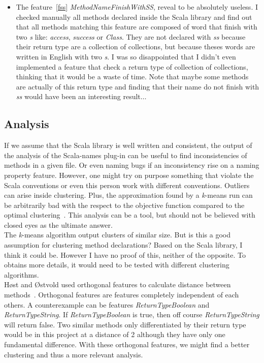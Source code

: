 \documentclass[12pt]{article}
\begin{document}
\begin{itemize}
\item The feature~\ref{fss} \textit{MethodNameFinishWithSS}, reveal to be absolutely useless. I checked manually all methods declared inside the Scala library and find out that all methods matching this feature are composed of word that finish with two \textit{s} like: \textit{access}, \textit{success} or \textit{Class}. They are not declared with \textit{ss} because their return type are a collection of collections, but because theses words are written in English with two \textit{s}. I was so disappointed that I didn't even implemented a feature that check a return type of collection of collections, thinking that it would be a waste of time. Note that maybe some methods are actually of this return type and finding that their name do not finish with \textit{ss} would have been an interesting result$\dots$\\
\end{itemize}

\subsection{Analysis}
\label{exp:analysis}
If we assume that the Scala library is well written and consistent, the output of the analysis of the Scala-names plug-in can be useful to find inconsistencies of methods in a given file. Or even naming bugs if an inconsistency rise on a naming property feature. However, one might try on purpose something that violate the Scala conventions or even this person work with different conventions. Outliers can arise inside clustering. Plus, the approximation found by a \textit{k}-means run can be arbitrarily bad with the respect to the objective function compared to the optimal clustering~\cite{kMeans2}. This analysis can be a tool, but should not be believed with closed eyes as the ultimate answer.\\
The \textit{k}-means algorithm output clusters of similar size. But is this a good assumption for clustering method declarations? Based on the Scala library, I think it could be. However I have no proof of this, neither of the opposite. To obtains more details, it would need to be tested with different clustering algorithms.\\
H{\o}st and {\O}stvold used orthogonal features to calculate distance between methods~\cite{DebugMN}. Orthogonal features are features completely independent of each others. A counterexample can be features \textit{ReturnTypeBoolean} and \textit{ReturnTypeString}. If \textit{ReturnTypeBoolean} is true, then off course \textit{ReturnTypeString} will return false. Two similar methods only differentiated by their return type would be in this project at a distance of 2 although they have only one fundamental difference. With these orthogonal features, we might find a better clustering and thus a more relevant analysis.
\end{document}
